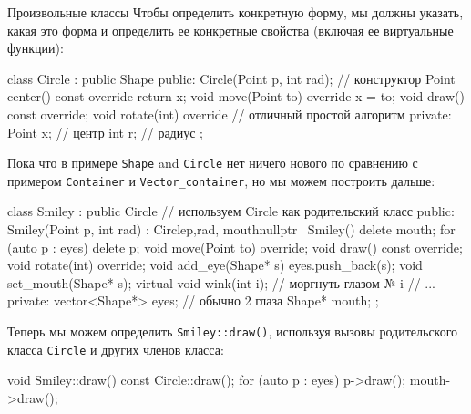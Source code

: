 \documentclass[
    8pt,
    hyperref={pdfencoding=unicode}
    ]{beamer}
\theoremstyle{definition}
\begin{document}
\begin{frame}{Произвольные классы}    
     Чтобы определить конкретную форму, мы должны указать, какая это форма 
    и определить ее конкретные свойства (включая ее виртуальные функции):
    \begin{cppcode}
        class Circle : public Shape {
            public:
            Circle(Point p, int rad); // конструктор
            Point center() const override
            {
                return x;
            }
            void move(Point to) override
            {
                x = to;
            }
            void draw() const override;
            void rotate(int) override {} // отличный простой алгоритм
            private:
            Point x; // центр
            int r; // радиус
        };
    \end{cppcode}

    \newpage
    Пока что в примере \texttt{Shape} and \texttt{Circle} нет ничего нового по сравнению с примером 
    \texttt{Container} и \texttt{Vector_container}, но мы можем построить дальше:
    
    {\small \begin{cppcode}
        class Smiley : public Circle { // используем Circle как родительский класс
            public:
            Smiley(Point p, int rad) : Circle{p,rad}, mouth{nullptr} { }
            ~Smiley()
            {
                delete mouth;
                for (auto p : eyes)
                delete p;
            }
            void move(Point to) override;
            void draw() const override;
            void rotate(int) override;
            void add_eye(Shape* s)
            {
                eyes.push_back(s);
            }
            void set_mouth(Shape* s);
            virtual void wink(int i); // моргнуть глазом № i 
            // ...
            private:
            vector<Shape*> eyes; // обычно 2 глаза
            Shape* mouth;
        };
    \end{cppcode}
    }

   Теперь мы можем определить \texttt{Smiley::draw()}, используя вызовы родительского класса \texttt{Circle} и других членов класса:
   {\small \begin{cppcode}
       void Smiley::draw() const
       {
           Circle::draw();
           for (auto p : eyes)
           p->draw();
           mouth->draw();
       }
   \end{cppcode} 
    }
    

\end{frame}
\end{document}
